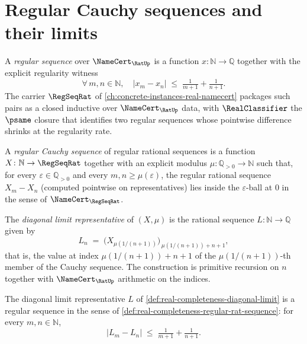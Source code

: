 \section{Regular Cauchy sequences and their limits}
\label{sec:real-completeness-regular-cauchy}

\begin{definition}
\label{def:real-completeness-regular-rat-sequence}
A \emph{regular sequence} over $\NameCert_{\RatUp}$ is a function $x \colon \mathbb{N} \to \mathbb{Q}$ together with the explicit regularity witness
$$ \forall\, m, n \in \mathbb{N}, \quad |x_m - x_n| \;\le\; \tfrac{1}{m+1} + \tfrac{1}{n+1}. $$
The carrier $\RegSeqRat$ of \autoref{ch:concrete-instances-real-namecert} packages such pairs as a closed inductive over $\NameCert_{\RatUp}$ data, with $\RealClassifier$ the $\psame$ closure that identifies two regular sequences whose pointwise difference shrinks at the regularity rate.
\end{definition}

\begin{definition}
\label{def:real-completeness-regular-cauchy-rat}
A \emph{regular Cauchy sequence} of regular rational sequences is a function $X \colon \mathbb{N} \to \RegSeqRat$ together with an explicit modulus $\mu \colon \mathbb{Q}_{>0} \to \mathbb{N}$ such that, for every $\varepsilon \in \mathbb{Q}_{>0}$ and every $m, n \ge \mu(\varepsilon)$, the regular rational sequence $X_m - X_n$ (computed pointwise on representatives) lies inside the $\varepsilon$-ball at $0$ in the sense of $\NameCert_{\RegSeqRat}$.
\end{definition}

\begin{definition}
\label{def:real-completeness-diagonal-limit}
The \emph{diagonal limit representative} of $(X, \mu)$ is the rational sequence $L \colon \mathbb{N} \to \mathbb{Q}$ given by
$$ L_n \;=\; \big(X_{\mu(1/(n+1))}\big)_{\,\mu(1/(n+1)) + n + 1}, $$
that is, the value at index $\mu(1/(n+1)) + n + 1$ of the $\mu(1/(n+1))$-th member of the Cauchy sequence. The construction is primitive recursion on $n$ together with $\NameCert_{\RatUp}$ arithmetic on the indices.
\end{definition}

\begin{theorem}
\label{thm:real-completeness-diagonal-regular}
The diagonal limit representative $L$ of \autoref{def:real-completeness-diagonal-limit} is a regular sequence in the sense of \autoref{def:real-completeness-regular-rat-sequence}: for every $m, n \in \mathbb{N}$,
$$ |L_m - L_n| \;\le\; \tfrac{1}{m+1} + \tfrac{1}{n+1}. $$
\end{theorem}

